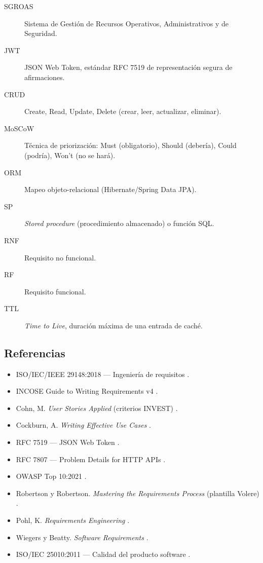 \documentclass[12pt,a4paper]{article}
\begin{document}
\begin{description}
  \item[SGROAS] Sistema de Gestión de Recursos Operativos, Administrativos y de Seguridad.
  \item[JWT] JSON Web Token, estándar RFC 7519 de representación segura de afirmaciones.
  \item[CRUD] Create, Read, Update, Delete (crear, leer, actualizar, eliminar).
  \item[MoSCoW] Técnica de priorización: Must (obligatorio), Should (debería), Could (podría), Won't (no se hará).
  \item[ORM] Mapeo objeto-relacional (Hibernate/Spring Data JPA).
  \item[SP] \textit{Stored procedure} (procedimiento almacenado) o función SQL.
  \item[RNF] Requisito no funcional.
  \item[RF] Requisito funcional.
  \item[TTL] \textit{Time to Live}, duración máxima de una entrada de caché.
\end{description}

\subsection{Referencias}
\label{sec:referencias}

\begin{itemize}
  \item ISO/IEC/IEEE 29148:2018 — Ingeniería de requisitos \cite{iso29148}.
  \item INCOSE Guide to Writing Requirements v4 \cite{incose}.
  \item Cohn, M. \textit{User Stories Applied} (criterios INVEST) \cite{cohn2004}.
  \item Cockburn, A. \textit{Writing Effective Use Cases} \cite{cockburn2001}.
  \item RFC 7519 — JSON Web Token \cite{rfc7519}.
  \item RFC 7807 — Problem Details for HTTP APIs \cite{rfc7807}.
  \item OWASP Top 10:2021 \cite{owasp}.
  \item Robertson y Robertson. \textit{Mastering the Requirements Process} (plantilla Volere) \cite{robertson2012}.
  \item Pohl, K. \textit{Requirements Engineering} \cite{pohl2010}.
  \item Wiegers y Beatty. \textit{Software Requirements} \cite{wiegers2013}.
  \item ISO/IEC 25010:2011 — Calidad del producto software \cite{iso25010}.
\end{itemize}
\end{document}
